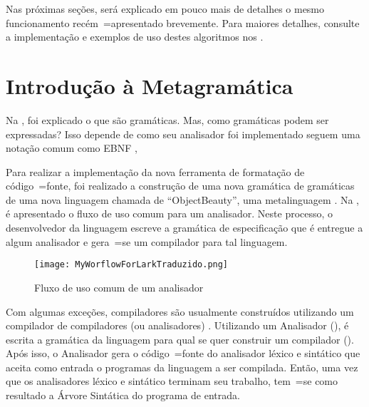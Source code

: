 Nas próximas seções,
será explicado em pouco mais de detalhes o mesmo funcionamento recém~=apresentado brevemente.
Para maiores detalhes,
consulte a implementação e
exemplos de uso destes algoritmos nos .


\section{Introdução à Metagramática}
\label{GrammarsGrammar}

Na ,
foi explicado o que são gramáticas.
Mas,
como gramáticas podem ser expressadas?
Isso depende de como seu analisador foi implementado  seguem uma notação comum como EBNF \cite{teachingEbnf,antlrBookTerrentParr,larkGrammarReference,larkStyleCheat},

Para realizar a implementação da nova ferramenta de formatação de código~=fonte,
foi realizado a construção de uma nova gramática de gramáticas de uma nova linguagem chamada de ``ObjectBeauty'',
uma metalinguagem \cite{compilersCompilerMetaLanguage}.
Na ,
é apresentado o fluxo de uso comum para um analisador.
Neste processo,
o desenvolvedor da linguagem escreve a gramática de especificação que é entregue a algum analisador e
gera~=se um compilador para tal linguagem.
\begin{figure}[!htb]
\caption{Fluxo de uso comum de um analisador}
\label{MyWorflowForLarkTraduzido}
\centering
\texttt{[image: MyWorflowForLarkTraduzido.png]}
\end{figure}

Com algumas exceções,
compiladores são usualmente construídos utilizando um compilador de compiladores (ou analisadores) \cite{compilersCompilerMetaLanguage}.
Utilizando um Analisador (),
é escrita a gramática da linguagem para qual se quer construir um compilador ().
Após isso,
o Analisador gera o código~=fonte do analisador léxico e
sintático que aceita como entrada o programas da linguagem a ser compilada.
Então,
uma vez que os analisadores léxico e
sintático terminam seu trabalho,
tem~=se como resultado a Árvore Sintática do programa de entrada.

